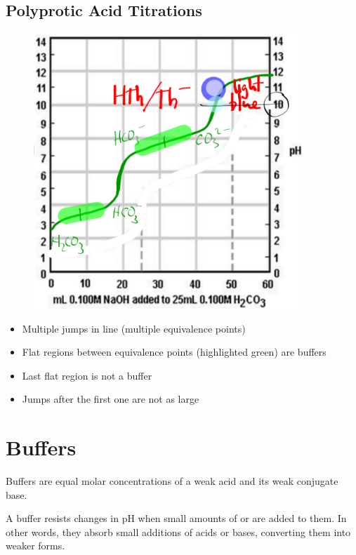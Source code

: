 \documentclass[a4paper,12pt]{article}
\begin{document}
\subsection{Polyprotic Acid Titrations}
\begin{figure}[H]
    \centering
    \includegraphics[width=0.9\textwidth]{polyprotic}
\end{figure}
\begin{itemize}
    \item{Multiple jumps in line (multiple equivalence points)}
    \item{Flat regions between equivalence points (highlighted green) are buffers}
    \item{Last flat region is not a buffer}
    \item{Jumps after the first one are not as large}
\end{itemize}

\pagebreak

\section{Buffers}
Buffers are equal molar concentrations of a weak acid and its weak conjugate base. 

A buffer resists changes in pH when small amounts of  or  are added to them. In other words, they absorb small additions of acids or bases, converting them into weaker forms.
\end{document}
